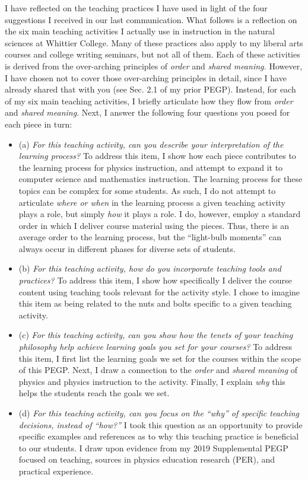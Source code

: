 \documentclass[../../../main.tex]{subfiles}
\begin{document}
I have reflected on the teaching practices I have used in light of the four suggestions I received in our last communication.  What follows is a reflection on the six main teaching activities I actually use in instruction in the natural sciences at Whittier College.  Many of these practices also apply to my liberal arts courses and college writing seminars, but not all of them.  Each of these activities is derived from the over-arching principles of \textit{order} and \textit{shared meaning.}  However, I have chosen not to cover those over-arching principles in detail, since I have already shared that with you (see Sec. 2.1 of my prior PEGP).  Instead, for each of my six main teaching activities, I briefly articulate how they flow from \textit{order} and \textit{shared meaning}.  Next, I answer the following four questions you posed for each piece in turn:
\begin{itemize}
\item (a) \textit{For this teaching activity, can you describe your interpretation of the learning process?}  To address this item, I show how each piece contributes to the learning process for physics instruction, and attempt to expand it to computer science and mathematics instruction.  The learning process for these topics can be complex for some students.  As such, I do not attempt to articulate \textit{where or when} in the learning process a given teaching activity plays a role, but simply \textit{how} it plays a role.  I do, however, employ a standard order in which I deliver course material using the pieces.  Thus, there is an average order to the learning process, but the ``light-bulb moments'' can always occur in different phases for diverse sets of students.
\item (b) \textit{For this teaching activity, how do you incorporate teaching tools and practices?}  To address this item, I show how specifically I deliver the course content using teaching tools relevant for the activity style.  I chose to imagine this item as being related to the nuts and bolts specific to a given teaching activity.
\item (c) \textit{For this teaching activity, can you show how the tenets of your teaching philosophy help achieve learning goals you set for your courses?} To address this item, I first list the learning goals we set for the courses within the scope of this PEGP.  Next, I draw a connection to the \textit{order} and \textit{shared meaning} of physics and physics instruction to the activity.  Finally, I explain \textit{why} this helps the students reach the goals we set.
\item (d) \textit{For this teaching activity, can you focus on the ``why'' of specific teaching decisions, instead of ``how?''}  I took this question as an opportunity to provide specific examples and references as to why this teaching practice is beneficial to our students.  I draw upon evidence from my 2019 Supplemental PEGP focused on teaching, sources in physics education research (PER), and practical experience.
\end{itemize} 
\end{document}
